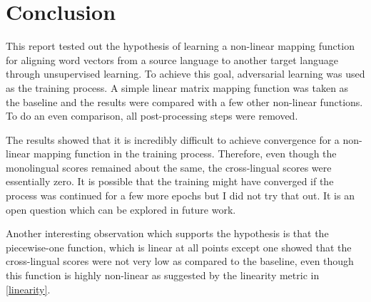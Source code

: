\documentclass[11pt]{article}
\begin{document}
\section{Conclusion}
This report tested out the hypothesis of learning a non-linear mapping function for aligning word vectors from a source language to another target language through unsupervised learning. To achieve this goal, adversarial learning was used as the training process. A simple linear matrix mapping function was taken as the baseline and the results were compared with a few other non-linear functions. To do an even comparison, all post-processing steps were removed.

The results showed that it is incredibly difficult to achieve convergence for a non-linear mapping function in the training process. Therefore, even though the monolingual scores remained about the same, the cross-lingual scores were essentially zero. It is possible that the training might have converged if the process was continued for a few more epochs but I did not try that out. It is an open question which can be explored in future work.

Another interesting observation which supports the hypothesis is that the piecewise-one function, which is linear at all points except one showed that the cross-lingual scores were not very low as compared to the baseline, even though this function is highly non-linear as suggested by the linearity metric in \ref{linearity}.




\end{document}
